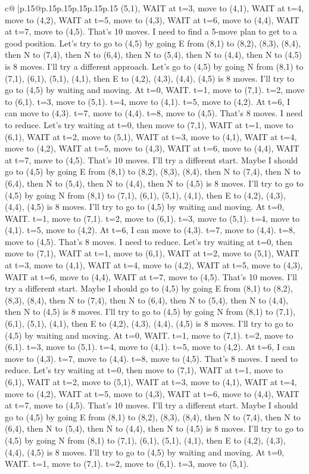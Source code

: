 \documentclass{article}
\begin{document}
{\begin{supertabular}{c@{$\;$}|p{.15\linewidth}@{}p{.15\linewidth}p{.15\linewidth}p{.15\linewidth}p{.15\linewidth}p{.15\linewidth}}
{{{(5,1), WAIT at t=3, move to (4,1), WAIT at t=4, move to (4,2), WAIT at t=5, move to (4,3), WAIT at t=6, move to (4,4), WAIT at t=7, move to (4,5). That's 10 moves. I need to find a 5{-}move plan to get to a good position. Let's try to go to (4,5) by going E from (8,1) to (8,2), (8,3), (8,4), then N to (7,4), then N to (6,4), then N to (5,4), then N to (4,4), then N to (4,5) is 8 moves. I'll try a different approach. Let's go to (4,5) by going N from (8,1) to (7,1), (6,1), (5,1), (4,1), then E to (4,2), (4,3), (4,4), (4,5) is 8 moves. I'll try to go to (4,5) by waiting and moving. At t=0, WAIT. t=1, move to (7,1). t=2, move to (6,1). t=3, move to (5,1). t=4, move to (4,1). t=5, move to (4,2). At t=6, I can move to (4,3). t=7, move to (4,4). t=8, move to (4,5). That's 8 moves. I need to reduce. Let's try waiting at t=0, then move to (7,1), WAIT at t=1, move to (6,1), WAIT at t=2, move to (5,1), WAIT at t=3, move to (4,1), WAIT at t=4, move to (4,2), WAIT at t=5, move to (4,3), WAIT at t=6, move to (4,4), WAIT at t=7, move to (4,5). That's 10 moves. I'll try a different start. Maybe I should go to (4,5) by going E from (8,1) to (8,2), (8,3), (8,4), then N to (7,4), then N to (6,4), then N to (5,4), then N to (4,4), then N to (4,5) is 8 moves. I'll try to go to (4,5) by going N from (8,1) to (7,1), (6,1), (5,1), (4,1), then E to (4,2), (4,3), (4,4), (4,5) is 8 moves. I'll try to go to (4,5) by waiting and moving. At t=0, WAIT. t=1, move to (7,1). t=2, move to (6,1). t=3, move to (5,1). t=4, move to (4,1). t=5, move to (4,2). At t=6, I can move to (4,3). t=7, move to (4,4). t=8, move to (4,5). That's 8 moves. I need to reduce. Let's try waiting at t=0, then move to (7,1), WAIT at t=1, move to (6,1), WAIT at t=2, move to (5,1), WAIT at t=3, move to (4,1), WAIT at t=4, move to (4,2), WAIT at t=5, move to (4,3), WAIT at t=6, move to (4,4), WAIT at t=7, move to (4,5). That's 10 moves. I'll try a different start. Maybe I should go to (4,5) by going E from (8,1) to (8,2), (8,3), (8,4), then N to (7,4), then N to (6,4), then N to (5,4), then N to (4,4), then N to (4,5) is 8 moves. I'll try to go to (4,5) by going N from (8,1) to (7,1), (6,1), (5,1), (4,1), then E to (4,2), (4,3), (4,4), (4,5) is 8 moves. I'll try to go to (4,5) by waiting and moving. At t=0, WAIT. t=1, move to (7,1). t=2, move to (6,1). t=3, move to (5,1). t=4, move to (4,1). t=5, move to (4,2). At t=6, I can move to (4,3). t=7, move to (4,4). t=8, move to (4,5). That's 8 moves. I need to reduce. Let's try waiting at t=0, then move to (7,1), WAIT at t=1, move to (6,1), WAIT at t=2, move to (5,1), WAIT at t=3, move to (4,1), WAIT at t=4, move to (4,2), WAIT at t=5, move to (4,3), WAIT at t=6, move to (4,4), WAIT at t=7, move to (4,5). That's 10 moves. I'll try a different start. Maybe I should go to (4,5) by going E from (8,1) to (8,2), (8,3), (8,4), then N to (7,4), then N to (6,4), then N to (5,4), then N to (4,4), then N to (4,5) is 8 moves. I'll try to go to (4,5) by going N from (8,1) to (7,1), (6,1), (5,1), (4,1), then E to (4,2), (4,3), (4,4), (4,5) is 8 moves. I'll try to go to (4,5) by waiting and moving. At t=0, WAIT. t=1, move to (7,1). t=2, move to (6,1). t=3, move to (5,1). }}}
\end{supertabular}}
\end{document}
